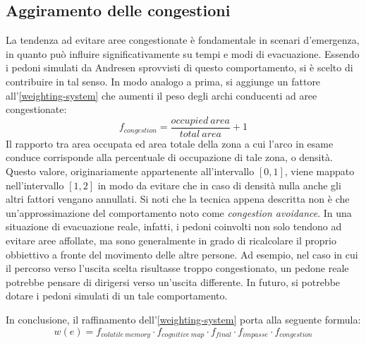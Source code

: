\documentclass[12pt,a4paper,openright,oneside]{book}
\begin{document}
\subsection{Aggiramento delle congestioni}
\label{congestion-avoidance-paragraph}
La tendenza ad evitare aree congestionate è fondamentale in scenari d'emergenza, in quanto può influire significativamente su tempi e modi di evacuazione. Essendo i pedoni simulati da Andresen \cite{Andresen2018} sprovvisti di questo comportamento, si è scelto di contribuire in tal senso. In modo analogo a prima, si aggiunge un fattore all'\cref{weighting-system} che aumenti il peso degli archi conducenti ad aree congestionate:
\begin{equation}
f_{congestion} = \frac{occupied\ area}{total\ area} + 1
\end{equation}
Il rapporto tra area occupata ed area totale della zona a cui l'arco in esame conduce corrisponde alla percentuale di occupazione di tale zona, o densità. Questo valore, originariamente appartenente all'intervallo \([0,1]\), viene mappato nell'intervallo \([1,2]\) in modo da evitare che in caso di densità nulla anche gli altri fattori vengano annullati. Si noti che la tecnica appena descritta non è che un'approssimazione del comportamento noto come \emph{congestion avoidance}. In una situazione di evacuazione reale, infatti, i pedoni coinvolti non solo tendono ad evitare aree  affollate, ma sono generalmente in grado di ricalcolare il proprio obbiettivo a fronte del movimento delle altre persone. Ad esempio, nel caso in cui il percorso verso l'uscita scelta risultasse troppo congestionato, un pedone reale potrebbe pensare di dirigersi verso un'uscita differente. In futuro, si potrebbe dotare i pedoni simulati di un tale comportamento.
\newline

In conclusione, il raffinamento dell'\cref{weighting-system} porta alla seguente formula:
\begin{equation}\label{weighting-system-refined}
w(e) = f_{volatile\ memory}\cdot f_{cognitive\ map}\cdot f_{final}\cdot f_{impasse}\cdot f_{congestion}
\end{equation}
\end{document}
